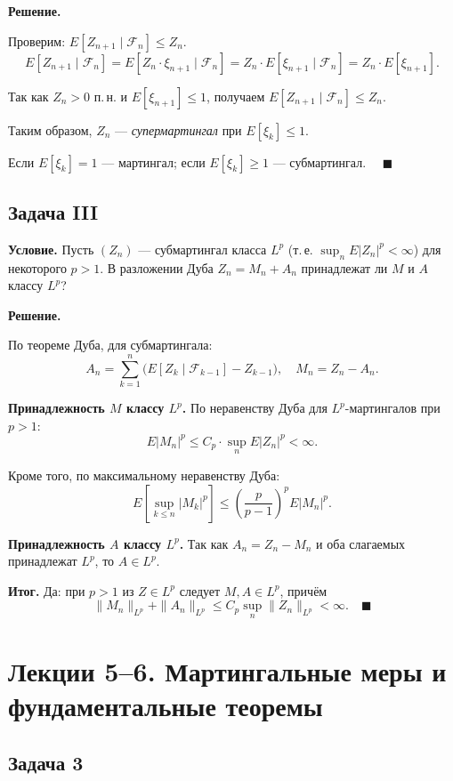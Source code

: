 \documentclass[12pt,a4paper]{article}
\theoremstyle{zadacha}
\begin{document}
\medskip
\textbf{Решение.}

Проверим: $E[Z_{n+1} \mid \mathcal{F}_n] \leq Z_n$.
\[
E[Z_{n+1} \mid \mathcal{F}_n] = E[Z_n \cdot \xi_{n+1} \mid \mathcal{F}_n] = Z_n \cdot E[\xi_{n+1} \mid \mathcal{F}_n] = Z_n \cdot E[\xi_{n+1}].
\]

Так как $Z_n > 0$ п.\,н. и $E[\xi_{n+1}] \leq 1$, получаем $E[Z_{n+1} \mid \mathcal{F}_n] \leq Z_n$.

Таким образом, $Z_n$ --- \emph{супермартингал} при $E[\xi_k] \leq 1$.

Если $E[\xi_k] = 1$ --- мартингал; если $E[\xi_k] \geq 1$ --- субмартингал. $\quad\blacksquare$

\subsection*{Задача III}

\textbf{Условие.} Пусть $(Z_n)$ --- субмартингал класса $L^p$ (т.\,е. $\sup_n E|Z_n|^p < \infty$) для некоторого $p > 1$. В разложении Дуба $Z_n = M_n + A_n$ принадлежат ли $M$ и $A$ классу $L^p$?

\medskip
\textbf{Решение.}

По теореме Дуба, для субмартингала:
\[
A_n = \sum_{k=1}^n \bigl(E[Z_k \mid \mathcal{F}_{k-1}] - Z_{k-1}\bigr), \quad M_n = Z_n - A_n.
\]

\textbf{Принадлежность $M$ классу $L^p$.} По неравенству Дуба для $L^p$-мартингалов при $p > 1$:
\[
E|M_n|^p \leq C_p \cdot \sup_n E|Z_n|^p < \infty.
\]

Кроме того, по максимальному неравенству Дуба:
\[
E\!\left[\sup_{k \leq n} |M_k|^p\right] \leq \left(\frac{p}{p-1}\right)^p E|M_n|^p.
\]

\textbf{Принадлежность $A$ классу $L^p$.} Так как $A_n = Z_n - M_n$ и оба слагаемых принадлежат $L^p$, то $A \in L^p$.

\textbf{Итог.} Да: при $p > 1$ из $Z \in L^p$ следует $M, A \in L^p$, причём
\[
\|M_n\|_{L^p} + \|A_n\|_{L^p} \leq C_p \sup_n \|Z_n\|_{L^p} < \infty. \quad \blacksquare
\]

\section{Лекции 5–6. Мартингальные меры и фундаментальные теоремы}

\subsection*{Задача 3}
\end{document}

